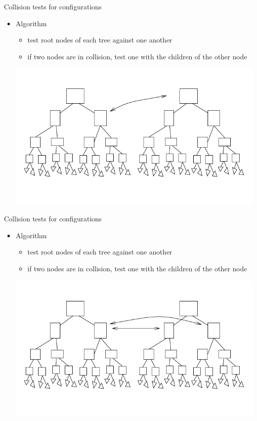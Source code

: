 \begin{frame} {Collision tests for configurations}
  \begin{itemize}
  \item Algorithm
    \begin{itemize}
    \item test root nodes of each tree against one another
    \item if two nodes are in collision, test one with the children of the other node
    \end{itemize}
    \centerline {
      \includegraphics[width=.8\linewidth]{figures/collision-test3.pdf}
    }
  \end{itemize}

\end{frame}

\begin{frame} {Collision tests for configurations}
  \begin{itemize}
  \item Algorithm
    \begin{itemize}
    \item test root nodes of each tree against one another
    \item if two nodes are in collision, test one with the children of the other node
    \end{itemize}
    \centerline {
      \includegraphics[width=.8\linewidth]{figures/collision-test4.pdf}
    }
  \end{itemize}

\end{frame}
